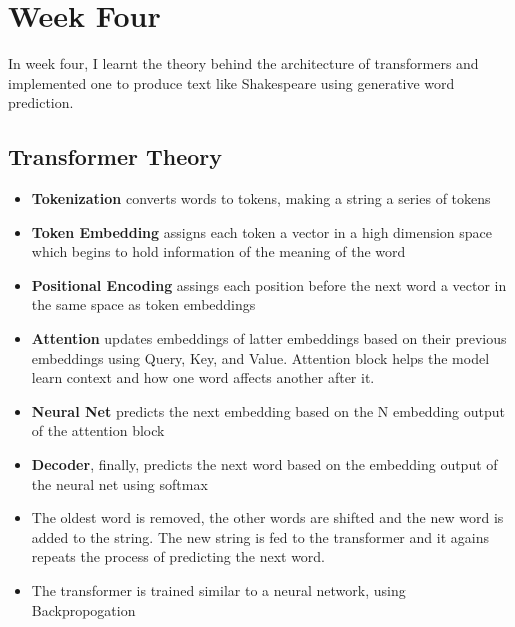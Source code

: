 \documentclass[12pt,a4paper]{article}
\begin{document}
\section{Week Four}
In week four, I learnt the theory behind the architecture of transformers and implemented one to produce text like Shakespeare using generative word prediction. 
\subsection{Transformer Theory}
\begin{itemize}
\item \textbf{Tokenization} converts words to tokens, making a string a series of tokens
\item \textbf{Token Embedding} assigns each token a vector in a high dimension space which begins to hold information of the meaning of the word
\item \textbf{Positional Encoding} assings each position before the next word a vector in the same space as token embeddings
\item \textbf{Attention} updates embeddings of latter embeddings based on their previous embeddings using Query, Key, and Value. Attention block helps the model learn context and how one word affects another after it.
\item \textbf{Neural Net} predicts the next embedding based on the N embedding output of the attention block
\item \textbf{Decoder}, finally, predicts the next word based on the embedding output of the neural net using softmax
\item The oldest word is removed, the other words are shifted and the new word is added to the string. The new string is fed to the transformer and it agains repeats the process of predicting the next word.
\item The transformer is trained similar to a neural network, using Backpropogation 
\end{itemize}
\end{document}
